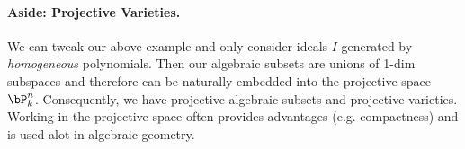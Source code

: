 \paragraph{Aside: Projective Varieties.} We can tweak our above example and only consider ideals $I$ generated by \textit{homogeneous} polynomials. Then our algebraic subsets are unions of 1-dim subspaces and therefore can be naturally embedded into the projective space $\bP^n_k$. Consequently, we have projective algebraic subsets and projective varieties. Working in the projective space often provides advantages (e.g. compactness) and is used alot in algebraic geometry.


